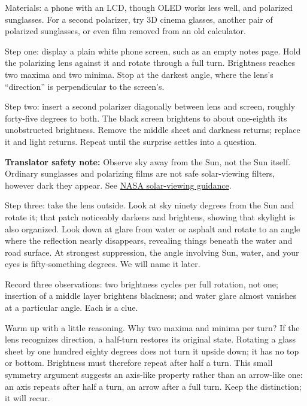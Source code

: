 \begin{experiment}
Materials: a phone with an LCD, though OLED works less well, and polarized sunglasses. For a second polarizer, try 3D cinema glasses, another pair of polarized sunglasses, or even film removed from an old calculator.

Step one: display a plain white phone screen, such as an empty notes page. Hold the polarizing lens against it and rotate through a full turn. Brightness reaches two maxima and two minima. Stop at the darkest angle, where the lens's ``direction'' is perpendicular to the screen's.

Step two: insert a second polarizer diagonally between lens and screen, roughly forty-five degrees to both. The black screen brightens to about one-eighth its unobstructed brightness. Remove the middle sheet and darkness returns; replace it and light returns. Repeat until the surprise settles into a question.

\textbf{Translator safety note:} Observe sky away from the Sun, not the Sun itself. Ordinary sunglasses and polarizing films are not safe solar-viewing filters, however dark they appear. See \href{https://science.nasa.gov/eclipses/safety/}{NASA solar-viewing guidance}.

Step three: take the lens outside. Look at sky ninety degrees from the Sun and rotate it; that patch noticeably darkens and brightens, showing that skylight is also organized. Look down at glare from water or asphalt and rotate to an angle where the reflection nearly disappears, revealing things beneath the water and road surface. At strongest suppression, the angle involving Sun, water, and your eyes is fifty-something degrees. We will name it later.
\end{experiment}

Record three observations: two brightness cycles per full rotation, not one; insertion of a middle layer brightens blackness; and water glare almost vanishes at a particular angle. Each is a clue.

Warm up with a little reasoning. Why two maxima and minima per turn? If the lens recognizes direction, a half-turn restores its original state. Rotating a glass sheet by one hundred eighty degrees does not turn it upside down; it has no top or bottom. Brightness must therefore repeat after half a turn. This small symmetry argument suggests an axis-like property rather than an arrow-like one: an axis repeats after half a turn, an arrow after a full turn. Keep the distinction; it will recur.

